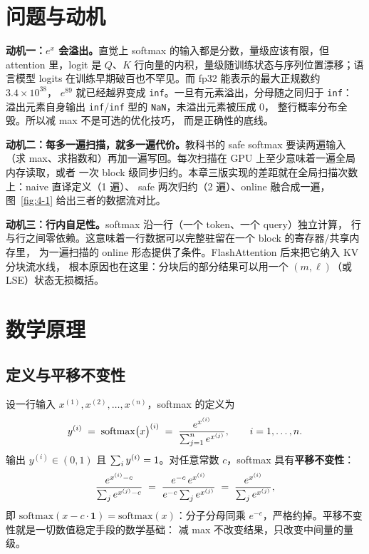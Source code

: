\section{问题与动机}

\textbf{动机一：$e^{x}$ 会溢出。}直觉上 softmax 的输入都是分数，量级应该有限，但
attention 里，logit 是 $Q$、$K$ 行向量的内积，量级随训练状态与序列位置漂移；语言模型
logits 在训练早期破百也不罕见。而 fp32 能表示的最大正规数约 $3.4\times 10^{38}$，
$e^{89}$ 就已经越界变成 \texttt{inf}。一旦有元素溢出，分母随之同归于 \texttt{inf}：
溢出元素自身输出 \texttt{inf}/\texttt{inf} 型的 \texttt{NaN}，未溢出元素被压成 0，
整行概率分布全毁。所以减 max 不是可选的优化技巧，
而是正确性的底线。

\textbf{动机二：每多一遍扫描，就多一遍代价。}教科书的 safe softmax 要读两遍输入
（求 max、求指数和）再加一遍写回。每次扫描在 GPU 上至少意味着一遍全局内存读取，或者
一次 block 级同步归约。本章三版实现的差距就在全局扫描次数上：naive 直译定义（1 遍）、
safe 两次归约（2 遍）、online 融合成一遍，图~\ref{fig:4-1} 给出三者的数据流对比。

\textbf{动机三：行内自足性。}\allowbreak{}softmax 沿一行（一个 token、一个 query）独立计算，
行与行之间零依赖。这意味着一行数据可以完整驻留在一个 block 的寄存器/共享内存里，
为一遍扫描的 online 形态提供了条件。FlashAttention 后来把它纳入 KV 分块流水线，
根本原因也在这里：分块后的部分结果可以用一个 $(m,\ell)$（或 LSE）状态无损概括。

\section{数学原理}

\subsection{定义与平移不变性}

设一行输入 $x^{(1)}, x^{(2)}, \dots, x^{(n)}$，softmax 的定义为
\begin{equation}
  y^{(i)} \;=\; \mathrm{softmax}\bigl(x\bigr)^{(i)}
  \;=\; \frac{e^{x^{(i)}}}{\sum\sb{j=1}^{n} e^{x^{(j)}}},
  \qquad i = 1, \dots, n .
  \label{eq:4-softmax-def}
\end{equation}
输出 $y^{(i)} \in (0,1)$ 且 $\sum\sb{i} y^{(i)} = 1$。对任意常数 $c$，softmax 具有\textbf{平移不变性}：
\begin{equation}
  \frac{e^{x^{(i)} - c}}{\sum\sb{j} e^{x^{(j)} - c}}
  \;=\; \frac{e^{-c}\, e^{x^{(i)}}}{e^{-c} \sum\sb{j} e^{x^{(j)}}}
  \;=\; \frac{e^{x^{(i)}}}{\sum\sb{j} e^{x^{(j)}}} ,
  \label{eq:4-shift}
\end{equation}
即 $\mathrm{softmax}(x - c\cdot \mathbf{1}) = \mathrm{softmax}(x)$：分子分母同乘
$e^{-c}$，严格约掉。平移不变性就是一切数值稳定手段的数学基础：
减 max 不改变结果，只改变中间量的量级。

